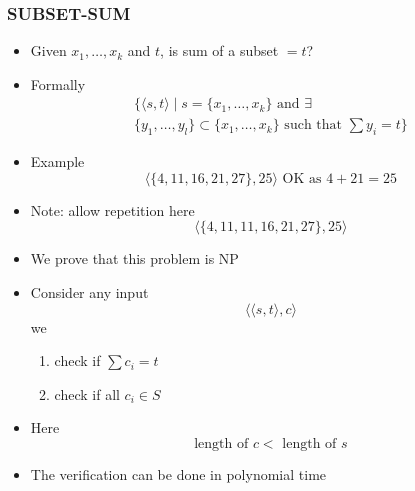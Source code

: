 \begin{frame}[allowframebreaks] \frametitle{SUBSET-SUM}
  \begin{itemize}
\item Given $x_1, \ldots, x_k$ and $t$, is sum of a subset $=t$?
\item Formally
  \begin{gather*}
   \{\langle  s,t\rangle 
\mid s=\{x_1, \ldots, x_k\}
\mbox{ and }
\exists \\
\{y_1, \ldots, y_l\}
\subset \{x_1, \ldots, x_k\} \text{ such that }
\sum y_i =t\}
\end{gather*}
\item Example
  \begin{equation*}
\langle  \{4,11,16,21,27\},25\rangle  \text{ OK as } 4+21=25
\end{equation*}
\item Note: allow repetition here
  \begin{equation*}
\langle  \{4,11,11,16,21,27\},25\rangle 
\end{equation*}
\item We prove that this problem is NP
\item Consider any input
  \begin{equation*}
  \langle  \langle  s,t\rangle ,c\rangle 
\end{equation*}
we 
  \begin{enumerate}
  \item check if $\sum c_i=t$
  \item check if all $c_i \in S$
  \end{enumerate}
\item Here
  \begin{equation*}
  \text{length of } c < \text{  length of } s
\end{equation*}
\item The verification can be done in polynomial time
\end{itemize}
\end{frame}





